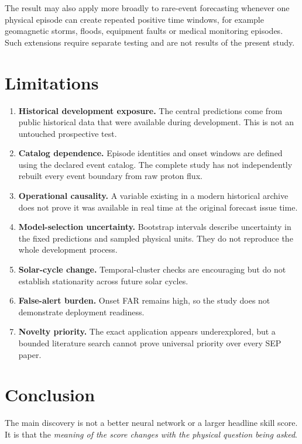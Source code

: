 \documentclass[11pt]{article}
\begin{document}
The result may also apply more broadly to rare-event forecasting whenever one physical episode can create repeated positive time windows, for example geomagnetic storms, floods, equipment faults or medical monitoring episodes. Such extensions require separate testing and are not results of the present study.

\section{Limitations}

\begin{enumerate}
    \item \textbf{Historical development exposure.} The central predictions come from public historical data that were available during development. This is not an untouched prospective test.
    \item \textbf{Catalog dependence.} Episode identities and onset windows are defined using the declared event catalog. The complete study has not independently rebuilt every event boundary from raw proton flux.
    \item \textbf{Operational causality.} A variable existing in a modern historical archive does not prove it was available in real time at the original forecast issue time.
    \item \textbf{Model-selection uncertainty.} Bootstrap intervals describe uncertainty in the fixed predictions and sampled physical units. They do not reproduce the whole development process.
    \item \textbf{Solar-cycle change.} Temporal-cluster checks are encouraging but do not establish stationarity across future solar cycles.
    \item \textbf{False-alert burden.} Onset FAR remains high, so the study does not demonstrate deployment readiness.
    \item \textbf{Novelty priority.} The exact application appears underexplored, but a bounded literature search cannot prove universal priority over every SEP paper.
\end{enumerate}

\section{Conclusion}

The main discovery is not a better neural network or a larger headline skill score. It is that the \emph{meaning of the score changes with the physical question being asked}.
\end{document}
